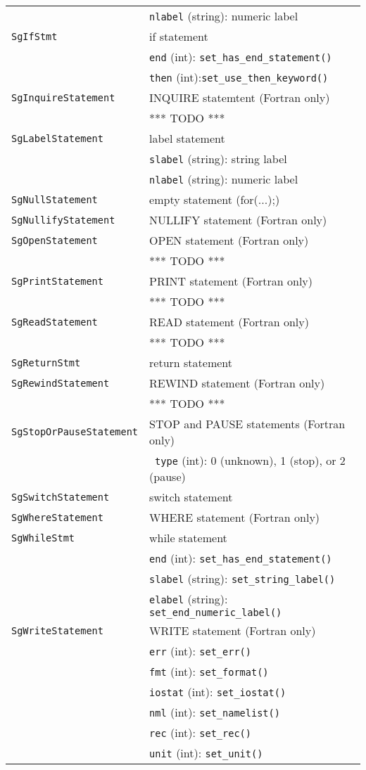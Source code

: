 \begin{longtable}[l]{l|p{10cm}}
 & \texttt{nlabel} (string): numeric label\\
 \texttt{SgIfStmt}& if statement\\
 & \texttt{end} (int): \texttt{set\_has\_end\_statement()}\\
 & \texttt{then} (int):\texttt{set\_use\_then\_keyword()}\\
 \texttt{SgInquireStatement}& INQUIRE statemtent (Fortran only)\\
 & *** TODO *** \\
 \texttt{SgLabelStatement}& label statement\\
 & \texttt{slabel} (string): string label\\
 & \texttt{nlabel} (string): numeric label\\
 \texttt{SgNullStatement}& empty statement (for(...){;})\\
 \texttt{SgNullifyStatement}& NULLIFY statement (Fortran only)\\
 \texttt{SgOpenStatement}& OPEN statement (Fortran only)\\
 & *** TODO *** \\
 \texttt{SgPrintStatement}& PRINT statement (Fortran only)\\
 & *** TODO *** \\
 \texttt{SgReadStatement}& READ statement (Fortran only)\\
 & *** TODO *** \\
 \texttt{SgReturnStmt}& return statement\\
 \texttt{SgRewindStatement}& REWIND statement (Fortran only)\\
 & *** TODO *** \\
 \texttt{SgStopOrPauseStatement}& STOP and PAUSE statements (Fortran only)\\
 & ~\texttt{type} (int): 0 (unknown), 1 (stop), or 2 (pause)\\
 \texttt{SgSwitchStatement}& switch statement\\
 \texttt{SgWhereStatement}& WHERE statement (Fortran only)\\
 \texttt{SgWhileStmt}& while statement\\
 & \texttt{end} (int): \texttt{set\_has\_end\_statement()}\\
 & \texttt{slabel} (string): \texttt{set\_string\_label()}\\
 & \texttt{elabel} (string): \texttt{set\_end\_numeric\_label()}\\
 \texttt{SgWriteStatement}& WRITE statement (Fortran only)\\
 & \texttt{err} (int): \texttt{set\_err()}\\
 & \texttt{fmt} (int): \texttt{set\_format()}\\
 & \texttt{iostat} (int): \texttt{set\_iostat()}\\
 & \texttt{nml} (int): \texttt{set\_namelist()}\\
 & \texttt{rec} (int): \texttt{set\_rec()}\\
 & \texttt{unit} (int): \texttt{set\_unit()}\\
 \end{longtable}

